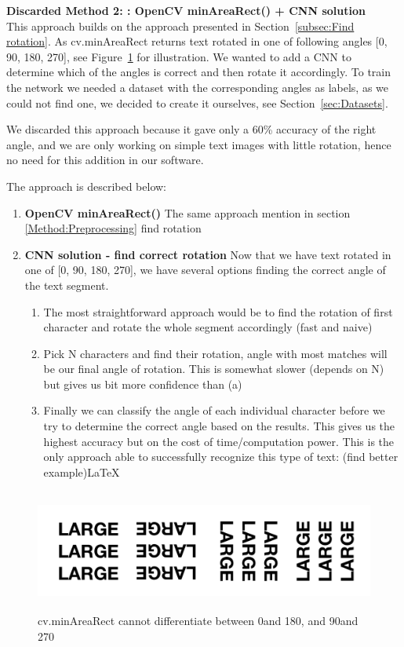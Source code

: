 \documentclass[Report.tex]{subfiles}
\begin{document}
\begin{flushleft}
  \textbf{Discarded Method 2: : OpenCV minAreaRect() + CNN solution} \\
  This approach builds on the approach presented in Section~\ref{subsec:Find rotation}. As cv.minAreaRect returns text rotated in one of following angles [0\textdegree, 90\textdegree, 180\textdegree, 270\textdegree], see Figure~\ref{fig:4angle_rot} for illustration. We wanted to add a CNN to determine which of the angles is correct and then rotate it accordingly.
  To train the network we needed a dataset with the corresponding angles as labels, as we could not find one, we decided to create it ourselves, see Section~\ref{sec:Datasets}. \par
  We discarded this approach because it gave only a 60\% accuracy of the right angle, and we are only working on simple text images with little rotation, hence no need for this addition in our software. \par
  The approach is described below:
  \begin{enumerate}
    \item \textbf{OpenCV minAreaRect()}
    The same approach mention in section \ref{Method:Preprocessing} find rotation
    \item \textbf{CNN solution - find correct rotation}
    Now that we have text rotated in one of [0\textdegree, 90\textdegree, 180\textdegree, 270\textdegree], we have several options finding the correct angle of the text segment.
    \begin{enumerate}
      \item{The most straightforward approach would be to find the rotation of first character and rotate the whole segment accordingly (fast and naive)}
      \item{Pick N characters and find their rotation, angle with most matches will be our final angle of rotation. This is somewhat slower (depends on N) but gives us bit more confidence than (a)}
      \item{Finally we can classify the angle of each individual character before we try to determine the correct angle based on the results. This gives us the highest accuracy but on the cost of time/computation power. This is the only approach able to successfully recognize this type of text: (find better example)\LaTeX}
      \end{enumerate}
    \end{enumerate}


    \begin{figure}[H]
      \centering
      \includegraphics[height=4cm]{res/4angle_rot.png}
      \caption{cv.minAreaRect cannot differentiate between 0\textdegree and 180\textdegree, and 90\textdegree and 270\textdegree}
      \label{fig:4angle_rot}
    \end{figure}


\end{flushleft}
\end{document}
